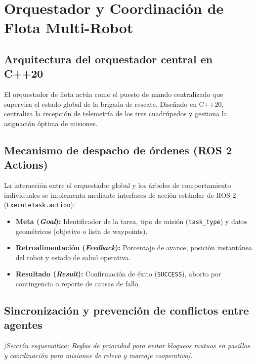 \chapter{Orquestador y Coordinación de Flota Multi-Robot}
\label{chap:orquestador}

\section{Arquitectura del orquestador central en C++20}
\label{sec:orquestador_c20}

El orquestador de flota actúa como el puesto de mando centralizado que supervisa el estado global de la brigada de rescate. Diseñado en C++20, centraliza la recepción de telemetría de los tres cuadrúpedos y gestiona la asignación óptima de misiones.

\section{Mecanismo de despacho de órdenes (ROS 2 Actions)}
\label{sec:despacho_ordenes}

La interacción entre el orquestador global y los árboles de comportamiento individuales se implementa mediante interfaces de acción estándar de ROS 2 (\texttt{ExecuteTask.action}):
\begin{itemize}
    \item \textbf{Meta (\textit{Goal}):} Identificador de la tarea, tipo de misión (\texttt{task\_type}) y datos geométricos (objetivo o lista de waypoints).
    \item \textbf{Retroalimentación (\textit{Feedback}):} Porcentaje de avance, posición instantánea del robot y estado de salud operativa.
    \item \textbf{Resultado (\textit{Result}):} Confirmación de éxito (\texttt{SUCCESS}), aborto por contingencia o reporte de causas de fallo.
\end{itemize}

\section{Sincronización y prevención de conflictos entre agentes}
\label{sec:sincronizacion_agentes}

\textit{[Sección esquemática: Reglas de prioridad para evitar bloqueos mutuos en pasillos y coordinación para misiones de relevo y marcaje cooperativo].}
